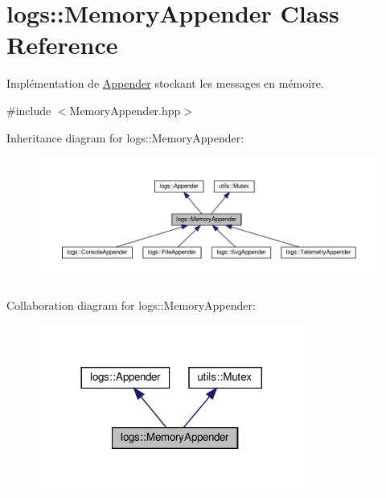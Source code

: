 \hypertarget{classlogs_1_1MemoryAppender}{}\section{logs\+:\+:Memory\+Appender Class Reference}
\label{classlogs_1_1MemoryAppender}


Implémentation de \hyperlink{classlogs_1_1Appender}{Appender} stockant les messages en mémoire.  




{\ttfamily \#include $<$Memory\+Appender.\+hpp$>$}



Inheritance diagram for logs\+:\+:Memory\+Appender\+:
\nopagebreak
\begin{figure}[H]
\begin{center}
\leavevmode
\includegraphics[width=350pt]{classlogs_1_1MemoryAppender__inherit__graph}
\end{center}
\end{figure}


Collaboration diagram for logs\+:\+:Memory\+Appender\+:
\nopagebreak
\begin{figure}[H]
\begin{center}
\leavevmode
\includegraphics[width=248pt]{classlogs_1_1MemoryAppender__coll__graph}
\end{center}
\end{figure}
